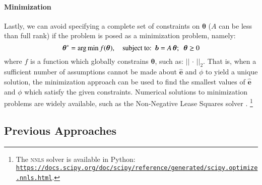 \paragraph{Minimization}
Lastly, we can avoid specifying a complete set of constraints on $\bm{\theta}$		%
($A$ can be less than full rank)
if the problem is posed as a minimization problem, namely:
\begin{equation}\label{eq:system-optimize}
\bm{\theta}^{*} = {\arg \min}
\thinspace f(\bm{\theta}),
\quad \textrm{subject to:}
\enspace\bm{b} = A\thinspace\bm{\theta};
\enspace\bm{\theta} \ge 0
\end{equation}
where $f$ is a function which globally constrains $\bm{\theta}$,
such as: ${\left|\left| \,\cdot\, \right|\right|}_2$.
That is, when a sufficient number of assumptions cannot be made about $\bm{\hat{e}}$ and $\phi$		%
to yield a unique solution,
the minimization approach can be used to find the smallest values of $\bm{\hat{e}}$ and $\phi$
which satisfy the given constraints.														%
Numerical solutions to minimization problems are widely available,
such as the Non-Negative Lease Squares solver \citep{Lawson1995}.%
\footnote{The \textsc{nnls} solver is available in Python:
   \href{https://docs.scipy.org/doc/scipy/reference/generated/scipy.optimize.nnls.html}
{\texttt{https://docs.scipy.org/doc/scipy/reference/generated/scipy.optimize.nnls.html}}.}
\subsection{Previous Approaches}														%

